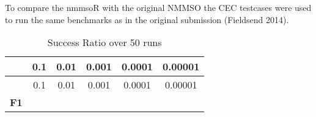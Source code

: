 \documentclass[12pt,a4paper]{article}
\begin{document}
To compare the nmmsoR with the original NMMSO the CEC testcases were
used to run the same benchmarks as in the original submission (Fieldsend
2014).

\begin{longtable}[c]{@{}cccccc@{}}
\caption{Success Ratio over 50 runs}\tabularnewline
\toprule
\begin{minipage}[b]{0.12\columnwidth}\centering\strut
~
\strut\end{minipage} &
\begin{minipage}[b]{0.07\columnwidth}\centering\strut
0.1
\strut\end{minipage} &
\begin{minipage}[b]{0.08\columnwidth}\centering\strut
0.01
\strut\end{minipage} &
\begin{minipage}[b]{0.09\columnwidth}\centering\strut
0.001
\strut\end{minipage} &
\begin{minipage}[b]{0.10\columnwidth}\centering\strut
0.0001
\strut\end{minipage} &
\begin{minipage}[b]{0.10\columnwidth}\centering\strut
0.00001
\strut\end{minipage}\tabularnewline
\midrule
\endfirsthead
\toprule
\begin{minipage}[b]{0.12\columnwidth}\centering\strut
~
\strut\end{minipage} &
\begin{minipage}[b]{0.07\columnwidth}\centering\strut
0.1
\strut\end{minipage} &
\begin{minipage}[b]{0.08\columnwidth}\centering\strut
0.01
\strut\end{minipage} &
\begin{minipage}[b]{0.09\columnwidth}\centering\strut
0.001
\strut\end{minipage} &
\begin{minipage}[b]{0.10\columnwidth}\centering\strut
0.0001
\strut\end{minipage} &
\begin{minipage}[b]{0.10\columnwidth}\centering\strut
0.00001
\strut\end{minipage}\tabularnewline
\midrule
\endhead
\begin{minipage}[t]{0.12\columnwidth}\centering\strut
\textbf{F1}
\strut\end{minipage} &
\begin{minipage}[t]{0.07\columnwidth}\centering\strut

\end{minipage}
\end{longtable}
\end{document}
